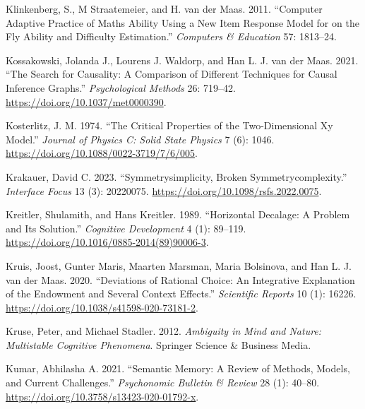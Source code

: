 \documentclass[
  a4paper,
  DIV=11,
  numbers=noendperiod,
  oneside]{scrreprt}
\newlength{\cslhangindent}
\newlength{\cslentryspacingunit} %
\newenvironment{CSLReferences}[2] %
 {%
  \setlength{\parindent}{0pt}
  \ifodd #1
  \let\oldpar\par
  \def\par{\hangindent=\cslhangindent\oldpar}
  \fi
  \setlength{\parskip}{#2\cslentryspacingunit}
 }%
 {}
\begin{document}
\begin{CSLReferences}{1}{0}
\leavevmode{}%
Klinkenberg, S., M Straatemeier, and H. van der Maas. 2011. {``Computer
Adaptive Practice of {Maths} Ability Using a New Item Response Model for
on the Fly Ability and Difficulty Estimation.''} \emph{Computers \&
Education} 57: 1813--24.

\leavevmode{}%
Kossakowski, Jolanda J., Lourens J. Waldorp, and Han L. J. van der Maas.
2021. {``The Search for Causality: {A} Comparison of Different
Techniques for Causal Inference Graphs.''} \emph{Psychological Methods}
26: 719--42. \url{https://doi.org/10.1037/met0000390}.

\leavevmode{}%
Kosterlitz, J. M. 1974. {``The Critical Properties of the
Two-Dimensional Xy Model.''} \emph{Journal of Physics C: Solid State
Physics} 7 (6): 1046. \url{https://doi.org/10.1088/0022-3719/7/6/005}.

\leavevmode{}%
Krakauer, David C. 2023. {``Symmetry\textendash simplicity, Broken
Symmetry\textendash complexity.''} \emph{Interface Focus} 13 (3):
20220075. \url{https://doi.org/10.1098/rsfs.2022.0075}.

\leavevmode{}%
Kreitler, Shulamith, and Hans Kreitler. 1989. {``Horizontal Decalage:
{A} Problem and Its Solution.''} \emph{Cognitive Development} 4 (1):
89--119. \url{https://doi.org/10.1016/0885-2014(89)90006-3}.

\leavevmode{}%
Kruis, Joost, Gunter Maris, Maarten Marsman, Maria Bolsinova, and Han L.
J. van der Maas. 2020. {``Deviations of Rational Choice: An Integrative
Explanation of the Endowment and Several Context Effects.''}
\emph{Scientific Reports} 10 (1): 16226.
\url{https://doi.org/10.1038/s41598-020-73181-2}.

\leavevmode{}%
Kruse, Peter, and Michael Stadler. 2012. \emph{Ambiguity in {Mind} and
{Nature}: {Multistable Cognitive Phenomena}}. {Springer Science \&
Business Media}.

\leavevmode{}%
Kumar, Abhilasha A. 2021. {``Semantic Memory: {A} Review of Methods,
Models, and Current Challenges.''} \emph{Psychonomic Bulletin \& Review}
28 (1): 40--80. \url{https://doi.org/10.3758/s13423-020-01792-x}.


\end{CSLReferences}
\end{document}
